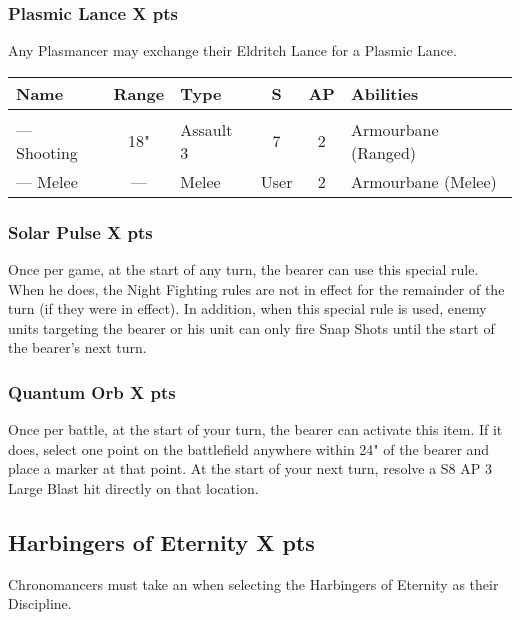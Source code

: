 \subsubsection[Plasmic Lance ]{Plasmic Lance  \hrulefill X pts}

Any Plasmancer may exchange their Eldritch Lance for a Plasmic Lance.

\label{Plasmic Lance}
\noindent
\begin{NiceTabular}{L{115 pt} c C{40pt} *{2}{c} >{\raggedright\arraybackslash}p{240pt}}
	Name & Range & Type & S & AP & Abilities \\
	\hline
	 &  &  &  &  & \\
	— Shooting & 18" & Assault 3 & 7 & 2 & Armourbane (Ranged) \\
	— Melee & — & Melee & User & 2 & Armourbane (Melee) \\
\end{NiceTabular}

\subsubsection[Solar Pulse ]{Solar Pulse  \hrulefill X pts}

Once per game, at the start of any turn, the bearer can use this special rule. When he does, the Night Fighting rules are not in effect for the remainder of the turn (if they were in effect). In addition, when this special rule is used, enemy units targeting the bearer or his unit can only fire Snap Shots until the start of the bearer’s next turn.

\subsubsection[Quantum Orb ]{Quantum Orb  \hrulefill X pts}

Once per battle, at the start of your turn, the bearer can activate this item. If it does, select one point on the battlefield anywhere within 24" of the bearer and place a marker at that point. At the start of your next turn, resolve a S8 AP 3 Large Blast hit directly on that location. %


\subsection[Harbingers of Eternity ]{Harbingers of Eternity  \hrulefill X pts}

Chronomancers must take an  when selecting the Harbingers of Eternity as their Discipline.

